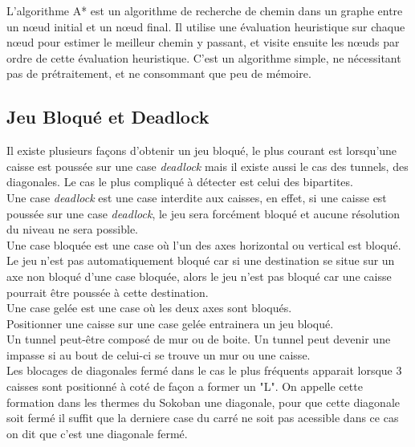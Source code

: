 \documentclass[a4paper, 11pt]{report}
\begin{document}
\label{A*}

L'algorithme A* \cite{wiki:Astar} est un algorithme de recherche de chemin dans un graphe entre un n\oe ud initial et un n\oe ud final. Il utilise une évaluation heuristique sur chaque n\oe ud pour estimer le meilleur chemin y passant, et visite ensuite les n\oe uds par ordre de cette évaluation heuristique. C'est un algorithme simple, ne nécessitant pas de prétraitement, et ne consommant que peu de mémoire.

\subsection{Jeu Bloqué et Deadlock}

\label{deadlock}

Il existe plusieurs façons d'obtenir un jeu bloqué, le plus courant est lorsqu'une caisse est poussée sur une case \emph{deadlock} mais il existe aussi le cas des tunnels, des diagonales. Le cas le plus compliqué à détecter est celui des bipartites.\\

Une case \emph{deadlock} est une case interdite aux caisses, en effet, si une caisse est poussée sur une case \emph{deadlock}, le jeu sera forcément bloqué et aucune résolution du niveau ne sera possible.\\

Une case bloquée est une case où l'un des axes horizontal ou vertical est bloqué. Le jeu n'est pas automatiquement bloqué car si une destination se situe sur un axe non bloqué d'une case bloquée, alors le jeu n'est pas bloqué car une caisse pourrait être poussée à cette destination.\\

\label{gele}
Une case gelée est une case où les deux axes sont bloqués.\\

Positionner  une caisse sur une case gelée entrainera un jeu bloqué.\\

Un tunnel peut-être composé de mur ou de boite. Un tunnel peut devenir une impasse si au bout de celui-ci se trouve un mur ou une caisse.\\

Les blocages de diagonales fermé dans le cas le plus fréquents apparait lorsque 3 caisses sont positionné à coté de façon a former un "L". On appelle cette formation dans les thermes du Sokoban une diagonale, pour que cette diagonale soit fermé il suffit que la derniere case du carré ne soit pas acessible dans ce cas on dit que c'est une diagonale fermé.\\
\end{document}
